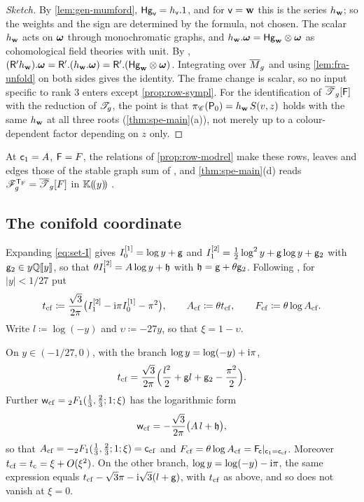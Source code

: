 \begin{proof}[Sketch]
By \cref{lem:gen-mumford}, $\mathsf{Hg}_{\mathsf{v}}=h_{\mathsf{v}}.1$, and for $\mathsf{v}=\mathbf{w}$ this is the series $h_{\mathbf{w}}$; so the weights and the sign are determined by the formula, not chosen. The scalar $h_{\mathbf{w}}$ acts on $\boldsymbol{\omega}$ through monochromatic graphs, and $h_{\mathbf{w}}.\boldsymbol{\omega}=\mathsf{Hg}_{\mathbf{w}}\otimes\boldsymbol{\omega}$ as cohomological field theories with unit. By \cite[Proposition~2.14]{PPZ15}, $(\mathsf{R}'h_{\mathbf{w}}).\boldsymbol{\omega}=\mathsf{R}'.(h_{\mathbf{w}}.\boldsymbol{\omega})=\mathsf{R}'.(\mathsf{Hg}_{\mathbf{w}}\otimes\boldsymbol{\omega})$. Integrating over $\overline{M}_g$ and using \cref{lem:fra-unfold} on both sides gives the identity. The frame change is scalar, so no input specific to rank $3$ enters except \cref{prop:row-sympl}. For the identification of $\overline{\mathscr{T}}_g[\mathsf{F}]$ with the reduction of $\mathscr{T}_g$, the point is that $\pi_{\mathscr{C}}(\mathsf{P}_0)=h_{\mathbf{w}}\,S(v,z)$ holds with the same $h_{\mathbf{w}}$ at all three roots (\cref{thm:spe-main}\textup{(a)}), not merely up to a colour-dependent factor depending on $z$ only.
\end{proof}

At $\mathsf{c}_{1}=A$, $\mathsf{F}=F$, the relations of \cref{prop:row-modrel} make these rows, leaves and edges those of the stable graph sum of \cite{BS}, and \cref{thm:spe-main}\textup{(d)} reads $\mathscr{F}_g^{\mathsf{T}_{\mathrm{F}}}=\overline{\mathscr{T}}_g[F]$ in $\mathbb{K}(\!(y)\!)$ .

\subsection{The conifold coordinate}

Expanding \eqref{eq:set-I} gives $I_0^{[1]}=\log y+\mathsf{g}$ and $I_1^{[2]}=\tfrac12\log^2y+\mathsf{g}\log y+\mathsf{g}_{2}$ with $\mathsf{g}_{2}\in y\mathbb{Q}[\![ y ]\!]$, so that $\theta I_1^{[2]}=A\log y+\mathfrak{h}$ with $\mathfrak{h}=\mathsf{g}+\theta\mathsf{g}_{2}$. Following \cite{BS}, for $|y|<1/27$ put
\[
t_{\mathrm{cf}}\coloneqq\frac{\sqrt3}{2\pi}\big(I_1^{[2]}-\mathrm{i}\pi I_0^{[1]}-\pi^2\big),\qquad A_{\mathrm{cf}}\coloneqq\theta t_{\mathrm{cf}},\qquad F_{\mathrm{cf}}\coloneqq\theta\log A_{\mathrm{cf}}.
\]
Write $l\coloneqq\log(-y)$ and $\upsilon\coloneqq-27y$, so that $\xi=1-\upsilon$.

\begin{lem}[{\Lg{Lemma~6.7}}]
\label{lem:fra-tcf}
On $y\in(-1/27,0)$, with the branch $\log y=\log(-y)+\mathrm{i}\pi$,
\[
t_{\mathrm{cf}}=\frac{\sqrt3}{2\pi}\Big(\frac{l^2}{2}+\mathsf{g} l+\mathsf{g}_{2}-\frac{\pi^2}{2}\Big).
\]
Further $\mathsf{w}_{\mathrm{cf}}={}_2F_1(\tfrac13,\tfrac23;1;\xi)$ has the logarithmic form
\begin{equation}
\label{eq:fra-log}
\mathsf{w}_{\mathrm{cf}}=-\frac{\sqrt3}{2\pi}\big(A\,l+\mathfrak{h}\big),
\end{equation}
so that $A_{\mathrm{cf}}=-{}_2F_1(\tfrac13,\tfrac23;1;\xi)=\mathsf{c}_{\mathrm{cf}}$ and $F_{\mathrm{cf}}=\theta\log A_{\mathrm{cf}}=\mathsf{F}_{\!\mathsf{c}}|_{\mathsf{c}_{1}=\mathsf{c}_{\mathrm{cf}}}$. Moreover $t_{\mathrm{cf}}=t_{\mathrm{c}}=\xi+O(\xi^2)$. On the other branch, $\log y=\log(-y)-\mathrm{i}\pi$, the same expression equals $t_{\mathrm{cf}}-\sqrt3\pi-\mathrm{i}\sqrt3(l+\mathsf{g})$, with $t_{\mathrm{cf}}$ as above, and so does not vanish at $\xi=0$.
\end{lem}

